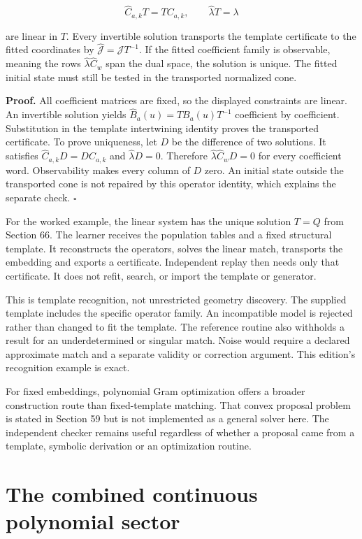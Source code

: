 \[
\boxed{
\widehat C_{a,k}T=TC_{a,k},\qquad
\widehat\lambda T=\lambda
}
\]

are linear in \(T\). Every invertible solution transports the template
certificate to the fitted coordinates by
\(\widehat{\mathcal J}=\mathcal JT^{-1}\). If the fitted coefficient
family is observable, meaning the rows \(\widehat\lambda\widehat C_w\)
span the dual space, the solution is unique. The fitted initial state
must still be tested in the transported normalized cone.

\textbf{Proof.} All coefficient matrices are fixed, so the displayed
constraints are linear. An invertible solution yields
\(\widehat B_a(u)=TB_a(u)T^{-1}\) coefficient by coefficient.
Substitution in the template intertwining identity proves the
transported certificate. To prove uniqueness, let \(D\) be the
difference of two solutions. It satisfies \(\widehat C_{a,k}D=DC_{a,k}\)
and \(\widehat\lambda D=0\). Therefore
\(\widehat\lambda\widehat C_wD=0\) for every coefficient word.
Observability makes every column of \(D\) zero. An initial state outside
the transported cone is not repaired by this operator identity, which
explains the separate check. \(\square\)

For the worked example, the linear system has the unique solution
\(T=Q\) from Section 66. The learner receives the population tables and
a fixed structural template. It reconstructs the operators, solves the
linear match, transports the embedding and exports a certificate.
Independent replay then needs only that certificate. It does not refit,
search, or import the template or generator.

This is template recognition, not unrestricted geometry discovery. The
supplied template includes the specific operator family. An incompatible
model is rejected rather than changed to fit the template. The reference
routine also withholds a result for an underdetermined or singular
match. Noise would require a declared approximate match and a separate
validity or correction argument. This edition's recognition example is
exact.

For fixed embeddings, polynomial Gram optimization offers a broader
construction route than fixed-template matching. That convex proposal
problem is stated in Section 59 but is not implemented as a general
solver here. The independent checker remains useful regardless of
whether a proposal came from a template, symbolic derivation or an
optimization routine.

\section{The combined continuous polynomial sector}\label{LSM:the-combined-continuous-polynomial-sector}

